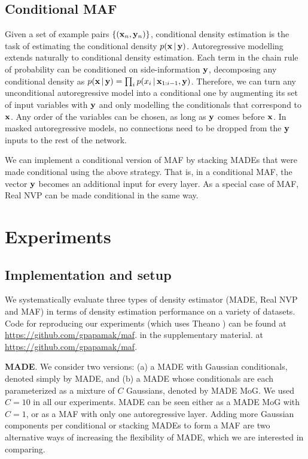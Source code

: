 \subsection{Conditional MAF}

Given a set of example pairs $\left\{\mathopen{}\left(\mathbf{x}_n,\mathbf{y}_n\right)\mathclose{}\right\}$, conditional density estimation is the task of estimating the conditional density $p\mathopen{}\left(\mathbf{x}\,|\,\mathbf{y}\right)\mathclose{}$. Autoregressive modelling extends naturally to conditional density estimation. Each term in the chain rule of probability can be conditioned on side-information $\mathbf{y}$, decomposing any conditional density as 
$p\mathopen{}\left(\mathbf{x}\,|\,\mathbf{y}\right)\mathclose{} = \prod_i{p\mathopen{}\left(x_i\,|\,\mathbf{x}_{1:i-1},\mathbf{y}\right)\mathclose{}}$.
Therefore, we can turn any unconditional autoregressive model into a conditional one by augmenting its set of input variables with $\mathbf{y}$ and only modelling the conditionals that correspond to $\mathbf{x}$. Any order of the variables can be chosen, as long as $\mathbf{y}$ comes before $\mathbf{x}$. In masked autoregressive models, no connections need to be dropped from the $\mathbf{y}$ inputs to the rest of the network.

We can implement a conditional version of MAF by stacking MADEs that were made conditional using the above strategy. That is, in a conditional MAF, the vector $\mathbf{y}$ becomes an additional input for every layer. As a special case of MAF, Real NVP can be made conditional in the same way.


\section{Experiments}
\label{sec:experiments}

\subsection{Implementation and setup}

We systematically evaluate three types of density estimator (MADE, Real NVP and MAF) in terms of density estimation performance on a variety of datasets. Code for reproducing our experiments (which uses Theano \citep{Theano:2016}) can be found 
\ifarxiv
at \url{https://github.com/gpapamak/maf}.
\else
\ifanonymize
in the supplementary material.
\else
at \url{https://github.com/gpapamak/maf}.
\fi
\fi

\textbf{MADE}\@. We consider two versions: (a) a MADE with Gaussian conditionals, denoted simply by MADE, and (b) a MADE whose conditionals are each parameterized as a mixture of $C$ Gaussians, denoted by MADE MoG\@. We used $C\!=\!10$ in all our experiments. MADE can be seen either as a MADE MoG with $C\!=\!1$, or as a MAF with only one autoregressive layer. Adding more Gaussian components per conditional or stacking MADEs to form a MAF are two alternative ways of increasing the flexibility of MADE, which we are interested in comparing.

